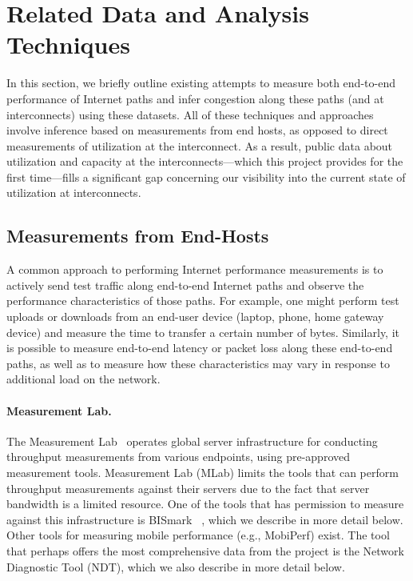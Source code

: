 \section{Related Data and Analysis Techniques}\label{sec:related}

In this section, we briefly outline existing attempts to measure both
end-to-end performance of Internet paths and infer
congestion along these paths (and at interconnects) using these
datasets.  
All of these techniques and approaches involve inference based on
measurements from end hosts, as opposed to direct measurements of
utilization at the interconnect. As a result, public data about
utilization and capacity at the interconnects---which this project
provides for the first time---fills a significant
gap concerning our visibility into the current state of utilization at
interconnects.  

\subsection{Measurements from End-Hosts}

A common approach to performing Internet performance measurements is to
actively send test traffic along end-to-end Internet paths and observe
the performance characteristics of those paths. For example, one might
perform test uploads or downloads from an end-user device (laptop,
phone, home gateway device) and measure the time to transfer a certain
number of bytes. Similarly, it is possible to measure end-to-end latency
or packet loss along these end-to-end paths, as well as to measure how
these characteristics may vary in response to additional load on the
network. 

\paragraph{Measurement Lab.} The Measurement Lab~\cite{www-mlab}
operates global server infrastructure for conducting throughput
measurements from various endpoints, using pre-approved measurement
tools. Measurement Lab (MLab)  limits the tools that can perform
throughput measurements against their servers due to the fact that
server bandwidth is a limited resource. One of the tools that has
permission to measure against this infrastructure is
BISmark~\cite{sundaresan2011,www-bismark} , which we 
describe in more detail below. Other tools for measuring mobile
performance (e.g., MobiPerf) exist. The tool that perhaps offers the
most comprehensive data from the project is the Network Diagnostic Tool
(NDT), which we also describe in more detail below.


